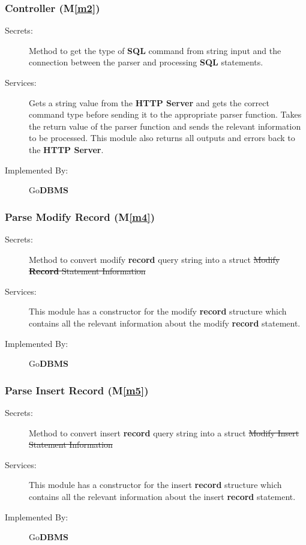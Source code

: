 \documentclass[12pt, titlepage]{article}
\newcommand{\mref}[1]{M\ref{#1}}
\begin{document}
\subsubsection{Controller (\mref{m2})}
\begin{description}
\item[Secrets:]Method to get the type of \textbf{SQL} command from string input and the connection between the parser and processing \textbf{SQL} statements.
\item[Services:]Gets a string value from the \textbf{HTTP Server} and gets the correct command type before sending it to the appropriate parser function. Takes the return value of the parser function and sends the relevant information to be processed. This module also returns all outputs and errors back to the \textbf{HTTP Server}.
\item[Implemented By:] Go\textbf{DBMS}
\end{description}

\subsubsection{Parse Modify \textbf{Record} (\mref{m4})}
\begin{description}
\item[Secrets:] {\color{red} Method to convert modify \textbf{record} query string into a struct} \sout{Modify \textbf{Record} Statement Information}
\item[Services:]This module has a constructor for the modify \textbf{record} structure which contains all the relevant information about the modify \textbf{record} statement.
\item[Implemented By:] Go\textbf{DBMS}
\end{description}

\subsubsection{Parse Insert \textbf{Record} (\mref{m5})}
\begin{description}
\item[Secrets:] {\color{red} Method to convert insert \textbf{record} query string into a struct} \sout{Modify Insert Statement Information}
\item[Services:]This module has a constructor for the insert \textbf{record} structure which contains all the relevant information about the insert \textbf{record} statement.
\item[Implemented By:] Go\textbf{DBMS}
\end{description}
\end{document}
